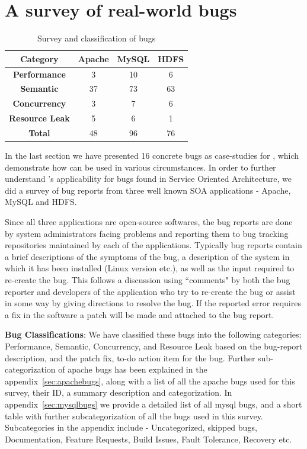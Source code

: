 \section{A survey of real-world bugs}
\label{sec:parikshanSurvey}

\begin{table}[!h]
\centering
\begin{tabular}{cccc}
\toprule
\textbf{Category} & \textbf{Apache} & \textbf{MySQL} & \textbf{HDFS} \\ \midrule
\textbf{Performance} & 3 & 10 & 6 \\ 
\textbf{Semantic} & 37 & 73 & 63 \\ 
\textbf{Concurrency} & 3 & 7 & 6 \\ 
\textbf{Resource Leak} & 5 & 6 & 1 \\ \midrule
\textbf{Total} & 48 & 96 & 76 \\
\bottomrule
\end{tabular}
\caption{Survey and classification of bugs}
\label{tab:survey}
\end{table}


In the last section we have presented 16 concrete bugs as case-studies for \parikshan, which demonstrate how \parikshan can be used in various circumstances. In order to further understand \parikshan's applicability for bugs found in Service Oriented Architecture, we did a survey of bug reports from three well known SOA applications - Apache, MySQL and HDFS. 

Since all three applications are open-source softwares, the bug reports are done by system administrators facing problems and reporting them to bug tracking repositories maintained by each of the applications. Typically bug reports contain a brief descriptions of the symptoms of the bug, a description of the system in which it has been installed (Linux version etc.), as well as the input required to re-create the bug.
This follows a discussion using ``comments" by both the bug reporter and developers of the application who try to re-create the bug or assist in some way by giving directions to resolve the bug. If the reported error requires a fix in the software a patch will be made and attached to the bug report. 

\textbf{Bug Classifications}:
We have classified these bugs into the following categories: Performance, Semantic, Concurrency, and Resource Leak based on the bug-report description, and the patch fix, to-do action item for the bug.
Further sub-categorization of apache bugs has been explained in the appendix~\ref{sec:apachebugs}, along with a list of all the apache bugs used for this survey, their ID, a summary description and categorization. In appendix~\ref{sec:mysqlbugs} we provide a detailed list of all mysql bugs, and a short table with further subcategorization of all the bugs used in this survey. 
Subcategories in the appendix include - Uncategorized, skipped bugs, Documentation, Feature Requests, Build Issues, Fault Tolerance, Recovery etc. 

